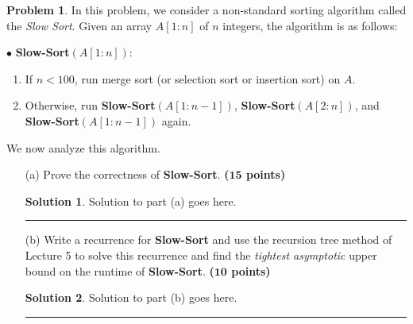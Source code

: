 \documentclass{article}
\theoremstyle{definition}
\newtheorem{problem}{Problem}
\def\fline{\rule{0.75\linewidth}{0.5pt}}
\newcommand{\finishline}{\begin{center}\fline\end{center}}
\newtheorem*{solution*}{Solution}
\newenvironment{solution}{\begin{solution*}}{{\finishline} \end{solution*}}
\newcommand{\grade}[1]{\hfill{\textbf{($\mathbf{#1}$ points)}}}
\begin{document}
\begin{problem}
	In this problem, we consider a non-standard sorting algorithm called the \emph{Slow Sort}. Given an array $A[1:n]$ of $n$ integers, the algorithm is as follows: 
	
	$\bullet$ \textbf{Slow-Sort}$(A[1:n])$:
	\begin{enumerate}
		\item If $n < 100$, run merge sort (or selection sort or insertion sort) on $A$.  
		\item Otherwise, run \textbf{Slow-Sort}$(A[1:n-1])$, \textbf{Slow-Sort}$(A[2:n])$, and \textbf{Slow-Sort}$(A[1:n-1])$ again. 
	\end{enumerate} 
	
	We now analyze this algorithm. 
	
	
	\begin{enumerate}
		\item [(a)] Prove the correctness of  \textbf{Slow-Sort}. \grade{15} 
		
				    \begin{solution}
	Solution to part (a) goes here. %
\end{solution}

			\item [(b)] Write a recurrence for  \textbf{Slow-Sort} and use the recursion tree method of Lecture 5 to solve this recurrence and find the \emph{tightest asymptotic} upper bound on the runtime of \textbf{Slow-Sort}. \grade{10}
	
				    \begin{solution}
	Solution to part (b) goes here. %
\end{solution}

	\end{enumerate}
\end{problem}

\smallskip
\end{document}
